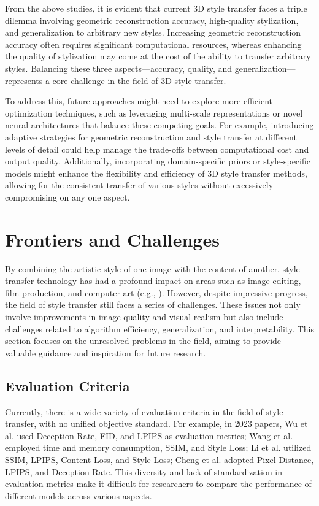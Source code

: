 \documentclass[preprint,12pt]{elsarticle}
\begin{document}
From the above studies, it is evident that current 3D style transfer faces a triple dilemma involving geometric reconstruction accuracy, high-quality stylization, and generalization to arbitrary new styles. Increasing geometric reconstruction accuracy often requires significant computational resources, whereas enhancing the quality of stylization may come at the cost of the ability to transfer arbitrary styles. Balancing these three aspects—accuracy, quality, and generalization—represents a core challenge in the field of 3D style transfer. 

To address this, future approaches might need to explore more efficient optimization techniques, such as leveraging multi-scale representations or novel neural architectures that balance these competing goals. For example, introducing adaptive strategies for geometric reconstruction and style transfer at different levels of detail could help manage the trade-offs between computational cost and output quality. Additionally, incorporating domain-specific priors or style-specific models might enhance the flexibility and efficiency of 3D style transfer methods, allowing for the consistent transfer of various styles without excessively compromising on any one aspect.

% 
\section{Frontiers and Challenges}

By combining the artistic style of one image with the content of another, style transfer technology has had a profound impact on areas such as image editing, film production, and computer art (e.g., \citep{05ke2023neural,20guan2022cdtnet,77wang2023deepvecfont}).
However, despite impressive progress, the field of style transfer still faces a series of challenges. These issues not only involve improvements in image quality and visual realism but also include challenges related to algorithm efficiency, generalization, and interpretability. This section focuses on the unresolved problems in the field, aiming to provide valuable guidance and inspiration for future research.

\subsection{Evaluation Criteria}

Currently, there is a wide variety of evaluation criteria in the field of style transfer, with no unified objective standard. For example, in 2023 papers, Wu et al.\citep{47wu2023preserving} used Deception Rate, FID, and LPIPS as evaluation metrics; Wang et al.\citep{72wang2023microast} employed time and memory consumption, SSIM, and Style Loss; Li et al.\citep{78lin2023adacm} utilized SSIM, LPIPS, Content Loss, and Style Loss; Cheng et al.\citep{80cheng2023user} adopted Pixel Distance, LPIPS, and Deception Rate. This diversity and lack of standardization in evaluation metrics make it difficult for researchers to compare the performance of different models across various aspects.
\end{document}
